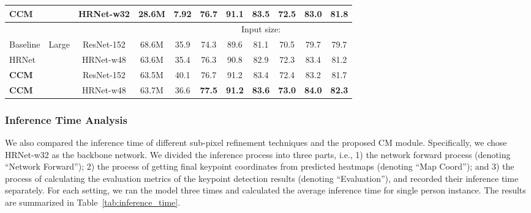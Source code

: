 \documentclass[twocolumn]{svjour3}          \smartqed  \usepackage{natbib}
\begin{document}
\begin{table*}[htbp]
\begin{tabular}{llccccccccc}
    \textbf{CCM} & \multicolumn{1}{c}{}  & HRNet-w32 & 28.6M & 7.92 & \textbf{76.7}         & \textbf{91.1}         & \textbf{83.5}         &  \textbf{72.5}        &  \textbf{83.0}       & \textbf{81.8}  \\
    \midrule
    \midrule
    & &  & & \multicolumn{7}{c}{Input size: } \\
    Baseline \citep{xiao2018simple} & \multicolumn{1}{c}{\multirow{4}[0]{*}{Large}} & ResNet-152 & 68.6M & 35.9 & 74.3     &  89.6     &  81.1     &  70.5     &  79.7     & 79.7 \\
    HRNet \citep{sun2019deep} & \multicolumn{1}{c}{} & HRNet-w48 & 63.6M & 35.4 & 76.3     &  90.8     &  82.9     &  {72.3}     &  {83.4}    & 81.2 \\
    \textbf{CCM} & \multicolumn{1}{c}{} & ResNet-152 & 63.5M & 40.1 & {76.7}     &  {91.2}     &  {83.4}     &  {72.4}     &  83.2    & {81.7} \\
    \textbf{CCM} & \multicolumn{1}{c}{} & HRNet-w48 & 63.7M & 36.6 & \textbf{77.5}     &  \textbf{91.2}     &  \textbf{83.6}     &  \textbf{73.0}     &  \textbf{84.0}    & \textbf{82.3} \\
    \bottomrule
    \end{tabular}\label{tab:SOTA_minival}\end{table*}

\subsubsection{Inference Time Analysis}
\label{subsubsec:inferencetime}
We also compared the inference time of different sub-pixel refinement techniques and the proposed CM module. Specifically, we chose HRNet-w32 as the backbone network. We divided the inference process into three parts, i.e., 1) the network forward process (denoting ``Network Forward''); 2) the process of getting final keypoint coordinates from predicted heatmaps (denoting ``Map  Coord''); and 3) the process of calculating the evaluation metrics of the keypoint detection results (denoting ``Evaluation''), and recorded their inference time separately. For each setting, we ran the model three times and calculated the average inference time for single person instance. The results are summarized in Table~\ref{tab:inference_time}.
\end{document}
